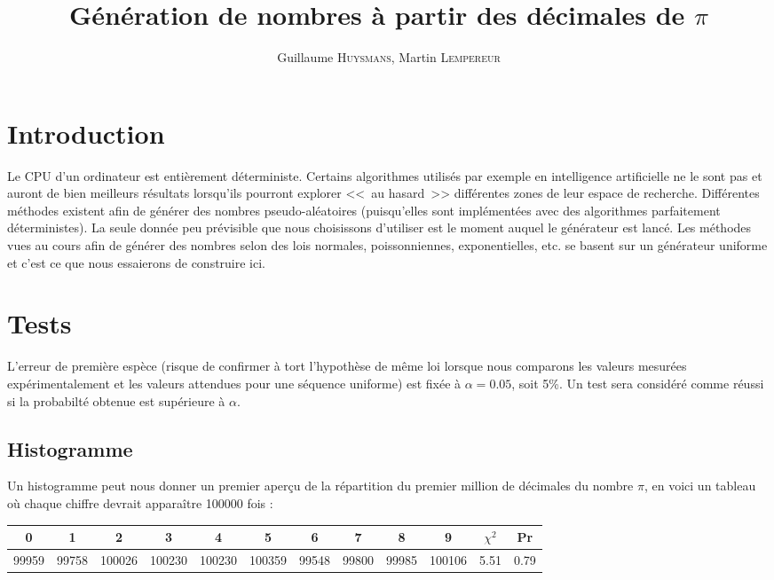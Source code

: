 \documentclass[12pt,a4paper]{article}
\author{Guillaume \textsc{Huysmans}, Martin \textsc{Lempereur}}
\title{Génération de nombres à partir des décimales de $\pi$}
\begin{document}
\maketitle

\section{Introduction}
Le CPU d'un ordinateur est entièrement déterministe. Certains algorithmes
utilisés par exemple en intelligence artificielle ne le sont pas et auront de
bien meilleurs résultats lorsqu'ils pourront explorer <<~au hasard~>> différentes
zones de leur espace de recherche. Différentes méthodes existent afin de générer
des nombres pseudo-aléatoires (puisqu'elles sont
implémentées avec des algorithmes parfaitement déterministes). La seule donnée
peu prévisible que nous choisissons d'utiliser est le moment auquel le générateur
est lancé.
Les méthodes vues au cours afin de générer des nombres selon des lois normales,
poissonniennes, exponentielles, etc. se basent sur un générateur uniforme et
c'est ce que nous essaierons de construire ici. 

\section{Tests}
L'erreur de première espèce (risque de confirmer à tort l'hypothèse de même loi
lorsque nous comparons les valeurs mesurées expérimentalement et les valeurs
attendues pour une séquence uniforme)
est fixée à $\alpha=0.05$, soit 5\%.
Un test sera considéré comme réussi si la probabilté obtenue est supérieure à $\alpha$.

\subsection{Histogramme}
Un histogramme peut nous donner un premier aperçu de la répartition
du premier million de décimales du nombre $\pi$, en voici un tableau
où chaque chiffre devrait apparaître 100000 fois :

\begin{center}
\begin{tabular}{c|c|c|c|c|c|c|c|c|c|c|c}
0 & 1 & 2 & 3 & 4 & 5 & 6 & 7 & 8 & 9 & $\chi^2$ & Pr \\ \hline
99959 & 99758 & 100026 & 100230 & 100230 &
100359 & 99548 & 99800 & 99985 & 100106 &
5.51 & 0.79
\end{tabular}
\end{center}
\end{document}
